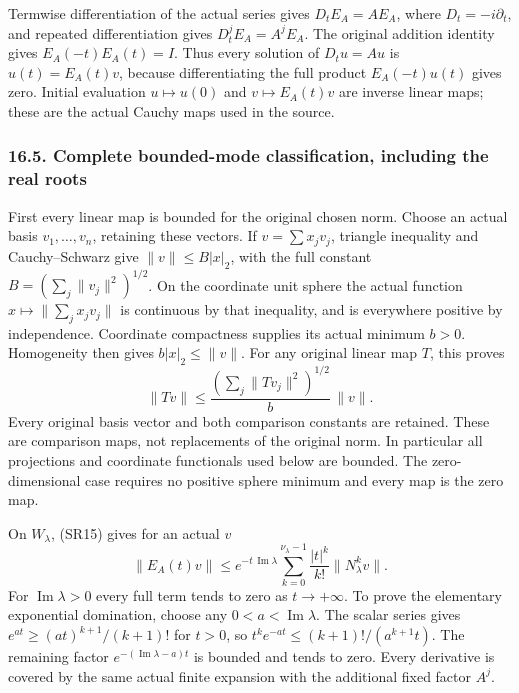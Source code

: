 \documentclass[
  11pt,
]{article}
\begin{document}
Termwise differentiation of the actual series gives \(D_tE_A=AE_A\),
where \(D_t=-i\partial_t\), and repeated differentiation gives
\(D_t^jE_A=A^jE_A\). The original addition identity gives
\(E_A(-t)E_A(t)=I\). Thus every solution of \(D_tu=Au\) is
\(u(t)=E_A(t)v\), because differentiating the full product
\(E_A(-t)u(t)\) gives zero. Initial evaluation \(u\mapsto u(0)\) and
\(v\mapsto E_A(t)v\) are inverse linear maps; these are the actual
Cauchy maps used in the source.

\subsubsection{16.5. Complete bounded-mode classification, including the
real
roots}\label{complete-bounded-mode-classification-including-the-real-roots}

First every linear map is bounded for the original chosen norm. Choose
an actual basis \(v_1,\ldots,v_n\), retaining these vectors. If
\(v=\sum x_jv_j\), triangle inequality and Cauchy--Schwarz give
\(\|v\|\leq B|x|_2\), with the full constant
\(B=(\sum_j\|v_j\|^2)^{1/2}\). On the coordinate unit sphere the actual
function \(x\mapsto\|\sum_jx_jv_j\|\) is continuous by that inequality,
and is everywhere positive by independence. Coordinate compactness
supplies its actual minimum \(b>0\). Homogeneity then gives
\(b|x|_2\leq\|v\|\). For any original linear map \(T\), this proves \[
 \|Tv\|\leq
     \frac{(\sum_j\|Tv_j\|^2)^{1/2}}{b}\,\|v\|.               \tag{SR16}
\] Every original basis vector and both comparison constants are
retained. These are comparison maps, not replacements of the original
norm. In particular all projections and coordinate functionals used
below are bounded. The zero-dimensional case requires no positive sphere
minimum and every map is the zero map.

On \(W_\lambda\), (SR15) gives for an actual \(v\) \[
 \|E_A(t)v\|\leq e^{-t\,\operatorname{Im}\lambda}
        \sum_{k=0}^{\nu_\lambda-1}
                    \frac{|t|^k}{k!}\|N_\lambda^kv\|.         \tag{SR17}
\] For \(\operatorname{Im}\lambda>0\) every full term tends to zero as
\(t\to+\infty\). To prove the elementary exponential domination, choose
any \(0<a<\operatorname{Im}\lambda\). The scalar series gives
\(e^{at}\geq (at)^{k+1}/(k+1)!\) for \(t>0\), so
\(t^ke^{-at}\leq(k+1)!/(a^{k+1}t)\). The remaining factor
\(e^{-(\operatorname{Im}\lambda-a)t}\) is bounded and tends to zero.
Every derivative is covered by the same actual finite expansion with the
additional fixed factor \(A^j\).
\end{document}
